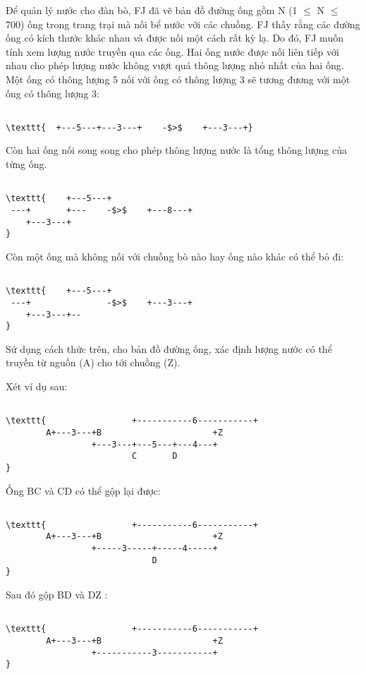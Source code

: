 

Để quản lý nước cho đàn bò, FJ đã vẽ bản đồ đường ống gồm N (1  $\le$  N  $\le$  700) ống trong trang trại mà nối bể nước với các chuồng. FJ thấy rằng các đường ống có kích thước khác nhau và được nối một cách rất kỳ lạ. Do đó, FJ muốn tính xem lượng nước truyền qua các ống. Hai ống nước được nối liên tiếp với nhau cho phép lượng nước không vượt quá thông lượng nhỏ nhất của hai ống. Một ống có thông lượng 5 nối với ống có thông lượng 3 sẽ tương đương với một ống có thông lượng 3:
\begin{verbatim}

\texttt{  +---5---+---3---+    -$>$    +---3---+}\end{verbatim}

Còn hai ống nối song song cho phép thông lượng nước là tổng thông lượng của từng ống.
\begin{verbatim}

\texttt{    +---5---+
 ---+       +---    -$>$    +---8---+
    +---3---+
}\end{verbatim}

Còn một ống mà không nối với chuồng bò nào hay ống nào khác có thể bỏ đi:
\begin{verbatim}

\texttt{    +---5---+
 ---+               -$>$    +---3---+
    +---3---+--
}\end{verbatim}

Sử dụng cách thức trên, cho bản đồ đường ống, xác định lượng nước có thể truyền từ nguồn (A) cho tới chuồng (Z).

Xét ví dụ sau:
\begin{verbatim}

\texttt{                 +-----------6-----------+
        A+---3---+B                      +Z
                 +---3---+---5---+---4---+
                         C       D
}\end{verbatim}

Ống BC và CD có thể gộp lại được:
\begin{verbatim}

\texttt{                 +-----------6-----------+
        A+---3---+B                      +Z
                 +-----3-----+-----4-----+
                             D
}\end{verbatim}

Sau đó gộp BD và DZ :
\begin{verbatim}

\texttt{                 +-----------6-----------+
        A+---3---+B                      +Z
                 +-----------3-----------+
}\end{verbatim}

